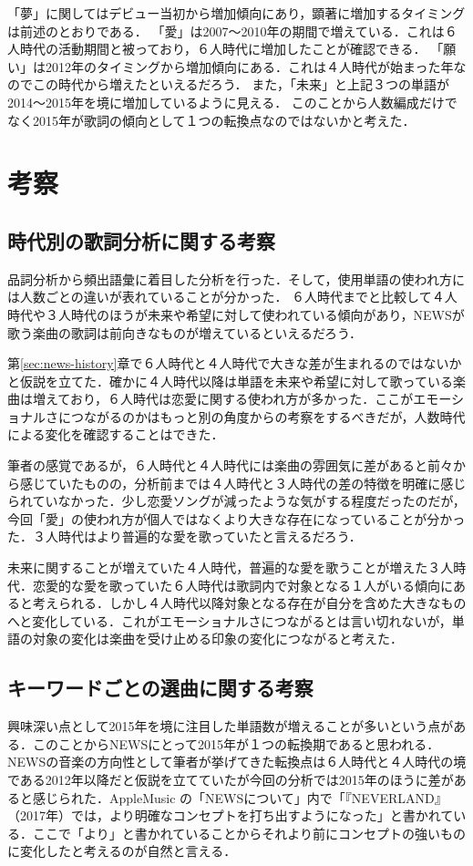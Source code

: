 「夢」に関してはデビュー当初から増加傾向にあり，顕著に増加するタイミングは前述のとおりである．
「愛」は2007～2010年の期間で増えている．これは６人時代の活動期間と被っており，６人時代に増加したことが確認できる．
「願い」は2012年のタイミングから増加傾向にある．これは４人時代が始まった年なのでこの時代から増えたといえるだろう．
また，「未来」と上記３つの単語が2014～2015年を境に増加しているように見える．
このことから人数編成だけでなく2015年が歌詞の傾向として１つの転換点なのではないかと考えた．

\section{考察}


\subsection{時代別の歌詞分析に関する考察}

品詞分析から頻出語彙に着目した分析を行った．そして，使用単語の使われ方には人数ごとの違いが表れていることが分かった．
６人時代までと比較して４人時代や３人時代のほうが未来や希望に対して使われている傾向があり，NEWSが歌う楽曲の歌詞は前向きなものが増えているといえるだろう．

第\ref{sec:news-history}章で６人時代と４人時代で大きな差が生まれるのではないかと仮説を立てた．確かに４人時代以降は単語を未来や希望に対して歌っている楽曲は増えており，６人時代は恋愛に関する使われ方が多かった．ここがエモーショナルさにつながるのかはもっと別の角度からの考察をするべきだが，人数時代による変化を確認することはできた．

筆者の感覚であるが，６人時代と４人時代には楽曲の雰囲気に差があると前々から感じていたものの，分析前までは４人時代と３人時代の差の特徴を明確に感じられていなかった．少し恋愛ソングが減ったような気がする程度だったのだが，今回「愛」の使われ方が個人ではなくより大きな存在になっていることが分かった．３人時代はより普遍的な愛を歌っていたと言えるだろう．

未来に関することが増えていた４人時代，普遍的な愛を歌うことが増えた３人時代．恋愛的な愛を歌っていた６人時代は歌詞内で対象となる１人がいる傾向にあると考えられる．しかし４人時代以降対象となる存在が自分を含めた大きなものへと変化している．これがエモーショナルさにつながるとは言い切れないが，単語の対象の変化は楽曲を受け止める印象の変化につながると考えた．

\subsection{キーワードごとの選曲に関する考察}
興味深い点として2015年を境に注目した単語数が増えることが多いという点がある．このことからNEWSにとって2015年が１つの転換期であると思われる．
NEWSの音楽の方向性として筆者が挙げてきた転換点は６人時代と４人時代の境である2012年以降だと仮説を立てていたが今回の分析では2015年のほうに差があると感じられた．AppleMusic の「NEWSについて」内で「『NEVERLAND』（2017年）では，より明確なコンセプトを打ち出すようになった\cite{NEWS-apple}」と書かれている．ここで「より」と書かれていることからそれより前にコンセプトの強いものに変化したと考えるのが自然と言える．

